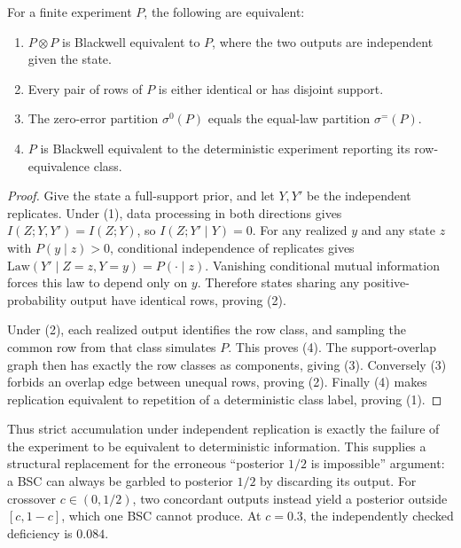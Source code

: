 
\begin{thmplain}
For a finite experiment $P$, the following are equivalent:
\begin{enumerate}
\item $P\otimes P$ is Blackwell equivalent to $P$, where the two outputs are independent given the state.
\item Every pair of rows of $P$ is either identical or has disjoint support.
\item The zero-error partition $\sigma^0(P)$ equals the equal-law partition $\sigma^{=}(P)$.
\item $P$ is Blackwell equivalent to the deterministic experiment reporting its row-equivalence class.
\end{enumerate}
\end{thmplain}
\begin{proof}
Give the state a full-support prior, and let $Y,Y'$ be the independent replicates. Under (1), data processing in both directions gives $I(Z;Y,Y')=I(Z;Y)$, so $I(Z;Y'\mid Y)=0$. For any realized $y$ and any state $z$ with $P(y\mid z)>0$, conditional independence of replicates gives $\mathrm{Law}(Y'\mid Z=z,Y=y)=P(\cdot\mid z)$. Vanishing conditional mutual information forces this law to depend only on $y$. Therefore states sharing any positive-probability output have identical rows, proving (2).

Under (2), each realized output identifies the row class, and sampling the common row from that class simulates $P$. This proves (4). The support-overlap graph then has exactly the row classes as components, giving (3). Conversely (3) forbids an overlap edge between unequal rows, proving (2). Finally (4) makes replication equivalent to repetition of a deterministic class label, proving (1).
\end{proof}

Thus strict accumulation under independent replication is exactly the failure of the experiment to be equivalent to deterministic information. This supplies a structural replacement for the erroneous ``posterior $1/2$ is impossible'' argument: a BSC can always be garbled to posterior $1/2$ by discarding its output. For crossover $c\in(0,1/2)$, two concordant outputs instead yield a posterior outside $[c,1-c]$, which one BSC cannot produce. At $c=0.3$, the independently checked deficiency is $0.084$.


